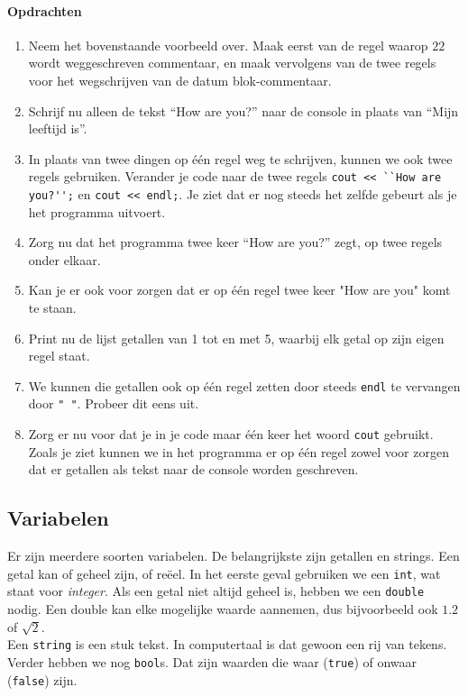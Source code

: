 \documentclass[12pt,a4paper]{article}
\newcommand{\icode}{\lstinline}
\begin{document}
\paragraph{Opdrachten}
\begin{enumerate}
		\item
			Neem het bovenstaande voorbeeld over. Maak eerst van de regel waarop $22$ wordt weggeschreven commentaar, en maak vervolgens van de twee regels voor het wegschrijven van de datum blok-commentaar.
		\item
			Schrijf nu alleen de tekst ``How are you?'' naar de console in plaats van ``Mijn leeftijd is''.
		\item
			In plaats van twee dingen op \'e\'en regel weg te schrijven, kunnen we ook twee regels gebruiken. Verander je code naar de twee regels \icode{cout << ``How are you?'';} en \icode{cout << endl;}. Je ziet dat er nog steeds het zelfde gebeurt als je het programma uitvoert.
		\item
			Zorg nu dat het programma twee keer ``How are you?'' zegt, op twee regels onder elkaar.
		\item
			Kan je er ook voor zorgen dat er op \'e\'en regel twee keer "How are you" komt te staan.
		\item
			Print nu de lijst getallen van 1 tot en met 5, waarbij elk getal op zijn eigen regel staat.
		\item
			We kunnen die getallen ook op \'e\'en regel zetten door steeds \icode{endl} te vervangen door \icode{" "}. Probeer dit eens uit.
		\item
			Zorg er nu voor dat je in je code maar \'e\'en keer het woord \icode{cout} gebruikt.
			Zoals je ziet kunnen we in het programma er op \'e\'en regel zowel voor zorgen dat er getallen als tekst naar de console worden geschreven. 
\end{enumerate}

\subsection{Variabelen}
Er zijn meerdere soorten variabelen. De belangrijkste zijn getallen en strings. Een getal kan of geheel zijn, of re\"eel. In het eerste geval gebruiken we een \icode{int}, wat staat voor \emph{integer}. Als een getal niet altijd geheel is, hebben we een \icode{double} nodig. Een double kan elke mogelijke waarde aannemen, dus bijvoorbeeld ook $1.2$ of $\sqrt 2$.\\
Een \icode{string} is een stuk tekst. In computertaal is dat gewoon een rij van tekens. Verder hebben we nog \icode{bool}s. Dat zijn waarden die waar (\icode{true}) of onwaar (\icode{false}) zijn.
\end{document}
